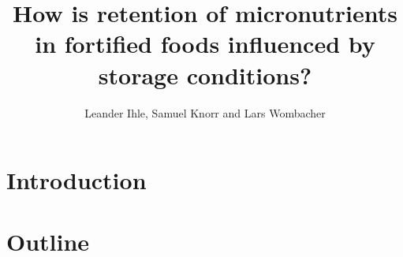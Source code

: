 \documentclass[a4paper,11pt]{article}
\title{How is retention of micronutrients in fortified foods influenced by storage conditions?}
\author{Leander Ihle, Samuel Knorr and Lars Wombacher}
\begin{document}
\maketitle
\section{Introduction}


\pagebreak
\section{Outline}



\pagebreak

\printbibliography
\end{document}
